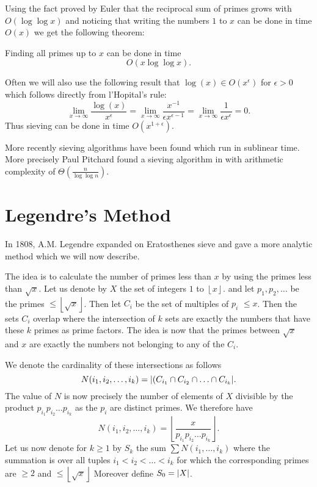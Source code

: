 Using the fact proved by Euler that the reciprocal sum of primes grows with $O(\log \log x)$ and 
noticing that writing the numbers $1$ to $x$ can be done in time $O(x)$ we get the following theorem:
 \begin{theorem}
	Finding all primes up to $x$ can be done in time
	\[
		O(x \log \log x)
	.\] 
\end{theorem}

Often we will also use the following result that 
$\log(x) \in O(x^{\epsilon})$ for $\epsilon > 0$ which follows directly from l'Hopital's rule:
\[
	\lim_{x \to \infty} \frac{\log(x)}{x^{\epsilon}} = \lim_{x \to \infty} \frac{x^{-1}}{\epsilon x^{\epsilon - 1}} = \lim_{x \to \infty} \frac{1}{\epsilon x^{\epsilon}} = 0
.\] 
Thus sieving can be done in time $O(x^{1+\epsilon})$.

More recently sieving algorithms have been found which run in sublinear time. More precisely Paul Pitchard found a sieving algorithm in \cite{pitchard81} with arithmetic complexity of
$\Theta(\frac{n}{\log\log n})$.

\section{Legendre's Method}
\label{sec:legendre}
In 1808, A.M. Legendre expanded on Eratosthenes sieve and gave a more analytic method which we will now describe.

The idea is to calculate the number of primes less than $x$ by using the primes less than $\sqrt{x}$.
Let us denote by $X$ the set of integers $1$ to $\left\lfloor x \right\rfloor$.
and let $p_1,p_2,\ldots$ be the primes $\leq \left\lfloor \sqrt{x}  \right\rfloor$.
Then let $C_{i}$ be the set of multiples of $p_{i}$ $\leq x$.
Then the sets $C_{i}$ overlap where the intersection of $k$ sets are exactly the numbers that have
these $k$ primes as prime factors.
The idea is now that the primes between $\sqrt{x}$ and $x$ are exactly the numbers not belonging to any of the $C_{i}$.

We denote the cardinality of these intersections as follows
\[
	N(i_1,i_2,\ldots,i_{k}) = \abs{(C_{i_1} \cap C_{i_2} \cap \ldots \cap C_{i_{k}}}
.\] 
The value of $N$ is now precisely the number of elements of $X$ divisible by the product $p_{i_1} p_{i_2} \ldots p_{i_{k}}$ 
as the $p_{i}$ are distinct primes. We therefore have
\[
	N(i_1,i_2,\ldots,i_{k}) = \left\lfloor \frac{x}{p_{i_1} p_{i_2} \ldots p_{i_{k}}} \right\rfloor
.\] 
Let us now denote for $k\geq 1$ by $S_{k}$ the sum $\sum N(i_1,\ldots,i_{k}) $ where the summation is over all tuples  $i_1 < i_2 < \ldots <i_{k}$
for which the corresponding primes are $\geq 2$ and $\leq \left\lfloor \sqrt{x}  \right\rfloor$
Moreover define $S_0 = \abs{X}$.

